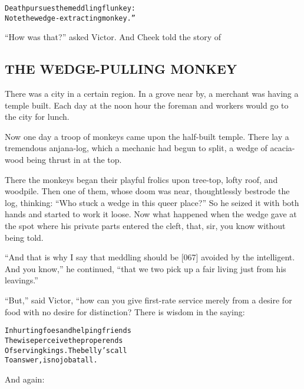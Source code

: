 \documentclass{article}
\renewenvironment{verbatim}{\begin{alltt}\normalfont\begin{centering}}{\end{centering}\end{alltt}}
\begin{document}
\begin{verbatim}
Death pursues the meddling flunkey:
Note the wedge-extracting monkey.”
\end{verbatim}
``How was that?'' asked Victor. And Cheek told the story of

\subsection{THE WEDGE-PULLING MONKEY}

There was a city in a certain region. In a grove near by, a
merchant was having a temple built. Each day at the noon hour the
foreman and workers would go to the city for lunch.

Now one day a troop of monkeys came upon the half-built temple.
There lay a tremendous anjana-log, which a mechanic had begun to
split, a wedge of acacia-wood being thrust in at the top.

There the monkeys began their playful frolics upon tree-top, lofty
roof, and woodpile. Then one of them, whose doom was near,
thoughtlessly bestrode the log, thinking:
``Who stuck a wedge in this queer place?'' So he seized it with
both hands and started to work it loose. Now what happened when the
wedge gave at the spot where his private parts entered the cleft,
that, sir, you know without being told.

``And that is why I say that meddling should be [067] avoided by the intelligent. And you know,''
he continued,
``that we two pick up a fair living just from his leavings.''

``But,'' said Victor, “how can you give first-rate service merely
from a desire for food with no desire for distinction? There is
wisdom in the saying:

\begin{verbatim}
In hurting foes and helping friends
The wise perceive the proper ends
Of serving kings. The belly's call
To answer, is no job at all.
\end{verbatim}
And again:
\end{document}
